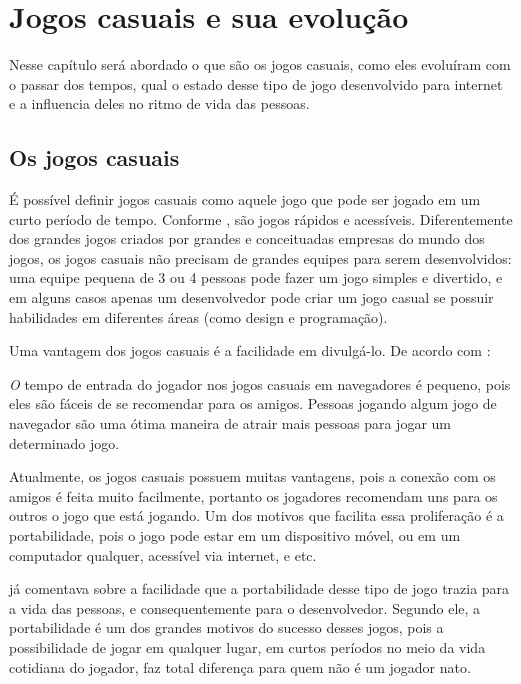 \section{Jogos casuais e sua evolução}

Nesse capítulo será abordado o que são os jogos casuais, como eles
evoluíram com o passar dos tempos, qual o estado desse tipo de jogo
desenvolvido para internet e a influencia deles no ritmo de vida das
pessoas.

\subsection{Os jogos casuais}

É possível definir jogos casuais como aquele jogo que pode ser jogado em um curto período
de tempo. Conforme , são jogos rápidos e acessíveis.
Diferentemente dos grandes jogos criados por grandes e conceituadas
empresas do mundo dos jogos, os jogos casuais não precisam de grandes
equipes para serem desenvolvidos: uma equipe pequena de 3 ou 4 pessoas
pode fazer um jogo simples e divertido, e em alguns casos apenas um
desenvolvedor pode criar um jogo casual se possuir habilidades em
diferentes áreas (como design e programação).

Uma vantagem dos jogos casuais é a facilidade em divulgá-lo. De acordo com
:

\begin{singlespacing}
\begin{citacao}{4cm}{0cm}\footnotesize \emph
    O tempo de entrada do jogador nos jogos casuais em navegadores é pequeno,
    pois eles são fáceis de se recomendar para os amigos. Pessoas jogando
    algum jogo de navegador são uma ótima maneira de atrair mais
    pessoas para jogar um determinado jogo.
\end{citacao}
\end{singlespacing}

Atualmente, os jogos casuais possuem muitas vantagens, pois a conexão
com os amigos é feita muito facilmente, portanto os jogadores
recomendam uns para os outros o jogo que está jogando. Um dos motivos
que facilita essa proliferação é a portabilidade, pois o jogo pode
estar em um dispositivo móvel, ou em um computador qualquer, acessível
via internet, e etc.

 já comentava sobre a facilidade que a
portabilidade desse tipo de jogo trazia para a vida das pessoas, e
consequentemente para o desenvolvedor. Segundo ele, a portabilidade é um
dos grandes motivos do sucesso desses jogos, pois a possibilidade de
jogar em qualquer lugar, em curtos períodos no meio da vida cotidiana
do jogador, faz total diferença para quem não é um jogador nato.

